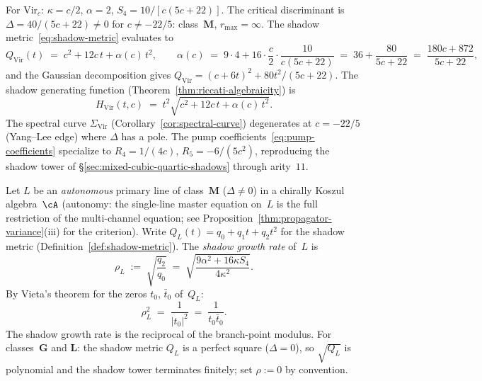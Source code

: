 \begin{example}
\label{ex:virasoro-dichotomy-verification}
For $\mathrm{Vir}_c$: $\kappa = c/2$, $\alpha = 2$,
$S_4 = 10/[c(5c{+}22)]$.  The critical discriminant is
$\Delta = 40/(5c{+}22) \neq 0$ for $c \neq -22/5$:
class~$\mathbf{M}$, $r_{\max} = \infty$.
The shadow metric~\eqref{eq:shadow-metric} evaluates to
\[
  Q_{\mathrm{Vir}}(t)
  \;=\;
  c^2 + 12c\,t + \alpha(c)\,t^2,
  \qquad
  \alpha(c) \;=\; 9\cdot 4 + 16\cdot\frac{c}{2}\cdot
  \frac{10}{c(5c{+}22)}
  \;=\; 36 + \frac{80}{5c{+}22}
  \;=\; \frac{180c+872}{5c{+}22},
\]
and the Gaussian decomposition gives
$Q_{\mathrm{Vir}} = (c + 6t)^2 + 80t^2/(5c{+}22)$.
The shadow generating function
(Theorem~\ref{thm:riccati-algebraicity}) is
\[
  H_{\mathrm{Vir}}(t,c)
  \;=\;
  t^2\sqrt{c^2 + 12c\,t + \alpha(c)\,t^2}.
\]
The spectral curve $\Sigma_{\mathrm{Vir}}$
(Corollary~\ref{cor:spectral-curve}) degenerates at
$c = -22/5$ (Yang--Lee edge) where $\Delta$ has a pole.
The pump coefficients~\eqref{eq:pump-coefficients} specialize to
$R_4 = 1/(4c)$,
$R_5 = -6/(5c^2)$,
reproducing the shadow tower of
\S\ref{sec:mixed-cubic-quartic-shadows}
through arity~$11$.
\end{example}

\begin{definition}
\label{def:shadow-growth-rate}
\label{def:shadow-radius}
Let $L$ be an \emph{autonomous} primary line of
class~$\mathbf{M}$ ($\Delta \neq 0$) in a
chirally Koszul algebra~$\cA$
\textup{(}autonomy: the single-line master equation
on~$L$ is the full restriction of the multi-channel
equation; see
Proposition~\textup{\ref{thm:propagator-variance}(iii)}
for the criterion\textup{)}.
Write $Q_L(t) = q_0 + q_1 t + q_2 t^2$ for the shadow
metric
\textup{(}Definition~\textup{\ref{def:shadow-metric}}).
The \emph{shadow growth rate} of~$L$ is
\begin{equation}\label{eq:shadow-growth-rate}
  \rho_L
  \;:=\;
  \sqrt{\frac{q_2}{q_0}}
  \;=\;
  \sqrt{\frac{9\alpha^2 + 16\kappa S_4}{4\kappa^2}}.
\end{equation}
By Vieta's theorem for the zeros $t_0$, $\bar{t}_0$ of~$Q_L$:
\begin{equation}\label{eq:vieta-rho}
  \rho_L^2
  \;=\;
  \frac{1}{|t_0|^2}
  \;=\;
  \frac{1}{t_0 \bar{t}_0}.
\end{equation}
The shadow growth rate is the reciprocal of the
branch-point modulus.
For classes~$\mathbf{G}$ and $\mathbf{L}$:
the shadow metric $Q_L$ is a perfect square
\textup{(}$\Delta = 0$\textup{)}, so $\sqrt{Q_L}$ is
polynomial and the shadow tower terminates finitely;
set $\rho := 0$ by convention.
\end{definition}

